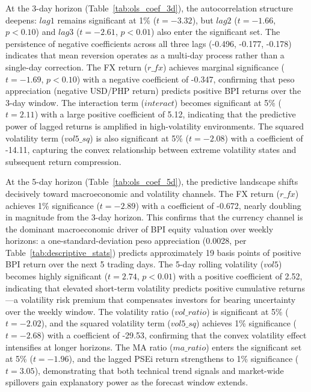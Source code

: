 \documentclass[12pt]{article}
\begin{document}
At the 3-day horizon (Table~\ref{tab:ols_coef_3d}), the autocorrelation structure deepens: $lag1$ remains significant at 1\% ($t = -3.32$), but $lag2$ ($t = -1.66$, $p < 0.10$) and $lag3$ ($t = -2.61$, $p < 0.01$) also enter the significant set. The persistence of negative coefficients across all three lags (-0.496, -0.177, -0.178) indicates that mean reversion operates as a multi-day process rather than a single-day correction. The FX return ($r\_fx$) achieves marginal significance ($t = -1.69$, $p < 0.10$) with a negative coefficient of -0.347, confirming that peso appreciation (negative USD/PHP return) predicts positive BPI returns over the 3-day window. The interaction term ($interact$) becomes significant at 5\% ($t = 2.11$) with a large positive coefficient of 5.12, indicating that the predictive power of lagged returns is amplified in high-volatility environments. The squared volatility term ($vol5\_sq$) is also significant at 5\% ($t = -2.08$) with a coefficient of -14.11, capturing the convex relationship between extreme volatility states and subsequent return compression.

At the 5-day horizon (Table~\ref{tab:ols_coef_5d}), the predictive landscape shifts decisively toward macroeconomic and volatility channels. The FX return ($r\_fx$) achieves 1\% significance ($t = -2.89$) with a coefficient of -0.672, nearly doubling in magnitude from the 3-day horizon. This confirms that the currency channel is the dominant macroeconomic driver of BPI equity valuation over weekly horizons: a one-standard-deviation peso appreciation (0.0028, per Table~\ref{tab:descriptive_stats}) predicts approximately 19 basis points of positive BPI return over the next 5 trading days. The 5-day rolling volatility ($vol5$) becomes highly significant ($t = 2.74$, $p < 0.01$) with a positive coefficient of 2.52, indicating that elevated short-term volatility predicts positive cumulative returns---a volatility risk premium that compensates investors for bearing uncertainty over the weekly window. The volatility ratio ($vol\_ratio$) is significant at 5\% ($t = -2.02$), and the squared volatility term ($vol5\_sq$) achieves 1\% significance ($t = -2.68$) with a coefficient of -29.53, confirming that the convex volatility effect intensifies at longer horizons. The MA ratio ($ma\_ratio$) enters the significant set at 5\% ($t = -1.96$), and the lagged PSEi return strengthens to 1\% significance ($t = 3.05$), demonstrating that both technical trend signals and market-wide spillovers gain explanatory power as the forecast window extends.
\end{document}
